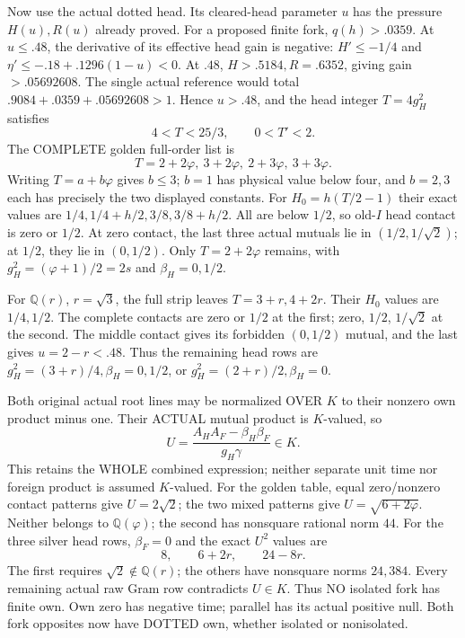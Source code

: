 \documentclass[11pt]{article}
\begin{document}
Now use the actual dotted head.
Its cleared-head parameter \(u\) has
the pressure \(H(u),R(u)\) already proved.
For a proposed finite fork, \(q(h)>.0359\).
At \(u\le.48\), the derivative of its
effective head gain is negative:
\(H'\le-1/4\) and
\(\eta'\le-.18+.1296(1-u)<0\).
At \(.48\), \(H>.5184,R=.6352\),
giving gain \(>.05692608\).
The single actual reference would total
\(.9084+.0359+.05692608>1\).
Hence \(u>.48\), and the head integer
\(T=4g_H^2\) satisfies
\[
                         4<T<25/3,\qquad0<T'<2 .
\]
The COMPLETE golden full-order list is
\[
                         T=2+2\varphi,\ 3+2\varphi,\ 2+3\varphi,\ 3+3\varphi .
\]
Writing \(T=a+b\varphi\) gives \(b\le3\);
\(b=1\) has physical value below four,
and \(b=2,3\) each has precisely the
two displayed constants.
For \(H_0=h(T/2-1)\) their exact values
are \(1/4,1/4+h/2,3/8,3/8+h/2\).
All are below \(1/2\), so old-\(I\)
head contact is zero or \(1/2\).
At zero contact, the last three actual
mutuals lie in \((1/2,1/\sqrt2)\);
at \(1/2\), they lie in \((0,1/2)\).
Only \(T=2+2\varphi\) remains, with
\(g_H^2=(\varphi+1)/2=2s\) and
\(\beta_H=0,1/2\).

For \(\mathbb Q(r)\), \(r=\sqrt3\),
the full strip leaves \(T=3+r,4+2r\).
Their \(H_0\) values are \(1/4,1/2\).
The complete contacts are zero or
\(1/2\) at the first; zero, \(1/2\),
\(1/\sqrt2\) at the second.
The middle contact gives its forbidden
\((0,1/2)\) mutual, and the last gives
\(u=2-r<.48\).
Thus the remaining head rows are
\(g_H^2=(3+r)/4,\beta_H=0,1/2\),
or \(g_H^2=(2+r)/2,\beta_H=0\).

Both original actual root lines may
be normalized OVER \(K\) to their
nonzero own product minus one.
Their ACTUAL mutual product is \(K\)-valued,
so
\[
                  U={\frac{A_HA_F-\beta_H\beta_F}{g_H\gamma}}\in K .
\]
This retains the WHOLE combined expression;
neither separate unit time nor foreign
product is assumed \(K\)-valued.
For the golden table, equal zero/nonzero
contact patterns give \(U=2\sqrt2\);
the two mixed patterns give
\(U=\sqrt{6+2\varphi}\).
Neither belongs to \(\mathbb Q(\varphi)\);
the second has nonsquare rational norm
\(44\).
For the three silver head rows,
\(\beta_F=0\) and the exact \(U^2\) values
are
\[
                             8,\qquad6+2r,\qquad24-8r .
\]
The first requires \(\sqrt2\notin\mathbb Q(r)\);
the others have nonsquare norms \(24,384\).
Every remaining actual raw Gram row
contradicts \(U\in K\).
Thus NO isolated fork has finite own.
Own zero has negative time; parallel
has its actual positive null.
Both fork opposites now have DOTTED
own, whether isolated or nonisolated.
\end{document}
